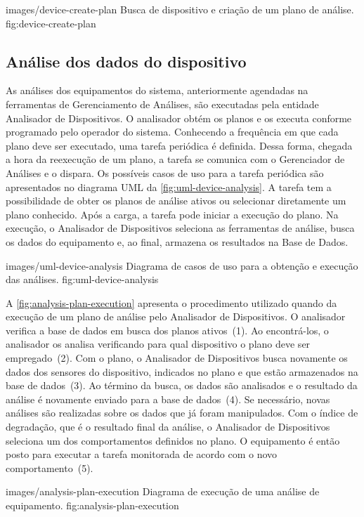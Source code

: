   {images/device-create-plan}
  {Busca de dispositivo e criação de um plano de análise.}
  {fig:device-create-plan}


\subsection{Análise dos dados do dispositivo}

As análises dos equipamentos do sistema, anteriormente agendadas na ferramentas de Gerenciamento de
Análises, são executadas pela entidade Analisador de Dispositivos. O analisador obtém os planos e os
executa conforme programado pelo operador do sistema. Conhecendo a frequência em que cada plano deve
ser executado, uma tarefa periódica é definida. Dessa forma, chegada a hora da reexecução de um
plano, a tarefa se comunica com o Gerenciador de Análises e o dispara. Os possíveis casos de uso
para a tarefa periódica são apresentados no diagrama \gls{UML} da \cref{fig:uml-device-analysis}. A
tarefa tem a possibilidade de obter os planos de análise ativos ou selecionar diretamente um plano
conhecido. Após a carga, a tarefa pode iniciar a execução do plano. Na execução, o Analisador de
Dispositivos seleciona as ferramentas de análise, busca os dados do equipamento e, ao final,
armazena os resultados na Base de Dados.

  {images/uml-device-analysis}
  {Diagrama de casos de uso para a obtenção e execução das análises.}
  {fig:uml-device-analysis}

A \cref{fig:analysis-plan-execution} apresenta o procedimento utilizado quando da execução de um
plano de análise pelo Analisador de Dispositivos. O analisador verifica a base de dados em busca dos
planos ativos~(1). Ao encontrá-los, o analisador os analisa verificando para qual dispositivo o
plano deve ser empregado~(2). Com o plano, o Analisador de Dispositivos busca novamente os dados dos
sensores do dispositivo, indicados no plano e que estão armazenados na base de dados~(3). Ao término
da busca, os dados são analisados e o resultado da análise é novamente enviado para a base de
dados~(4). Se necessário, novas análises são realizadas sobre os dados que já foram manipulados. Com
o índice de degradação, que é o resultado final da análise, o Analisador de Dispositivos seleciona
um dos comportamentos definidos no plano. O equipamento é então posto para executar a tarefa
monitorada de acordo com o novo comportamento~(5).

  {images/analysis-plan-execution}
  {Diagrama de execução de uma análise de equipamento.}
  {fig:analysis-plan-execution}


